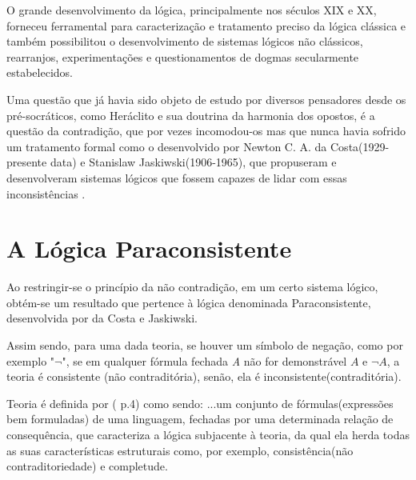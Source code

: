 O grande desenvolvimento da lógica, 
principalmente nos séculos XIX e XX, 
forneceu ferramental para caracterização e 
tratamento preciso da lógica clássica 
e também possibilitou o desenvolvimento de sistemas lógicos não clássicos, 
rearranjos, experimentações e 
questionamentos de dogmas secularmente estabelecidos.

Uma questão que já havia sido objeto de estudo por diversos pensadores desde os pré-socráticos, 
como Heráclito e sua doutrina da harmonia dos opostos, 
é a questão da contradição, 
que por vezes incomodou-os 
mas que nunca havia sofrido um tratamento formal 
como o desenvolvido por 
Newton C. A. da Costa(1929-presente data) e 
Stanislaw Jaskiwski(1906-1965), 
que propuseram e desenvolveram sistemas lógicos que fossem capazes de lidar com essas inconsistências \cite{DecioKrause}. 





\section{A Lógica Paraconsistente}





Ao restringir-se o princípio da não contradição, 
em um certo sistema lógico, 
obtém-se um resultado que pertence à lógica denominada Paraconsistente, 
desenvolvida por da Costa e Jaskiwski. 



Assim sendo, para uma dada teoria, 
se houver um símbolo de negação, 
como por exemplo "\emph{$\neg $}", 
se em qualquer fórmula fechada \emph{A} não for demonstrável \emph{$A$} e \emph{$\neg A $}, 
a teoria é consistente (não contraditória), 
senão, ela é inconsistente(contraditória).


Teoria é definida por \citeauthor{Gomes2013}(\citeyear{Gomes2013} p.4) como sendo:
\citacao
{
...um conjunto de fórmulas(expressões bem formuladas) de uma linguagem, 
fechadas por uma determinada relação de consequência, 
que caracteriza a lógica subjacente à teoria, 
da qual ela herda todas as suas características estruturais como, 
por exemplo, consistência(não contraditoriedade) e completude.
}


